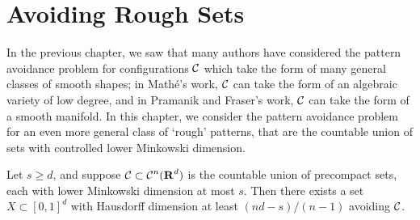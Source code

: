 
\chapter{Avoiding Rough Sets}
\label{ch:RoughSets}

In the previous chapter, we saw that many authors have considered the pattern avoidance problem for configurations $\operatorname{\mathcal{C}}$ which take the form of many general classes of smooth shapes; in Math\'{e}'s work, $\operatorname{\mathcal{C}}$ can take the form of an algebraic variety of low degree, and in Pramanik and Fraser's work, $\operatorname{\mathcal{C}}$ can take the form of a smooth manifold. In this chapter, we consider the pattern avoidance problem for an even more general class of `rough' patterns, that are the countable union of sets with controlled lower Minkowski dimension.
%
\begin{theorem}\label{mainTheorem}
	Let $s \geq d$, and suppose $\operatorname{\mathcal{C}} \subset \operatorname{\mathcal{C}}^n(\operatorname{\mathbf{R}}^d)$ is the countable union of precompact sets, each with lower Minkowski dimension at most $s$. Then there exists a set $X \subset [0,1]^d$ with Hausdorff dimension at least $(nd - s)/(n-1)$ avoiding $\operatorname{\mathcal{C}}$.
\end{theorem}

